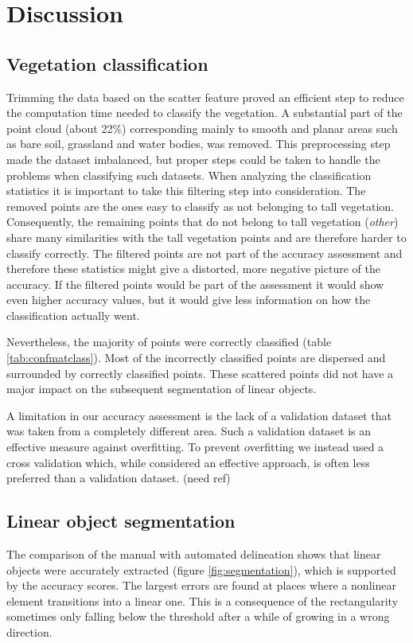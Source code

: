 \section{Discussion}
\subsection{Vegetation classification}
Trimming the data based on the scatter feature proved an efficient step to reduce the computation time needed to classify the vegetation. A substantial part of the point cloud (about 22\%) corresponding mainly to smooth and planar areas such as bare soil, grassland and water bodies, was removed. This preprocessing step made the dataset imbalanced, but proper steps could be taken to handle the problems when classifying such datasets. When analyzing the classification statistics it is important to take this filtering step into consideration. The removed points are the ones easy to classify as not belonging to tall vegetation. Consequently, the remaining points that do not belong to tall vegetation (\textit{other}) share many similarities with the tall vegetation points and are therefore harder to classify correctly. The filtered points are not part of the accuracy assessment and therefore these statistics might give a distorted, more negative picture of the accuracy. If the filtered points would be part of the assessment it would show even higher accuracy values, but it would give less information on how the classification actually went.

Nevertheless, the majority of points were correctly classified (table \ref{tab:confmatclass}). Most of the incorrectly classified points are dispersed and surrounded by correctly classified points. These scattered points did not have a major impact on the subsequent segmentation of linear objects.

A limitation in our accuracy assessment is the lack of a validation dataset that was taken from a completely different area. Such a validation dataset is an effective measure against overfitting. To prevent overfitting we instead used a cross validation which, while considered an effective approach, is often less preferred than a validation dataset. (need ref)

\subsection{Linear object segmentation}
The comparison of the manual with automated delineation shows that linear objects were accurately extracted (figure \ref{fig:segmentation}), which is supported by the accuracy scores. The largest errors are found at places where a nonlinear element transitions into a linear one. This is a consequence of the rectangularity sometimes only falling below the threshold after a while of growing in a wrong direction.

